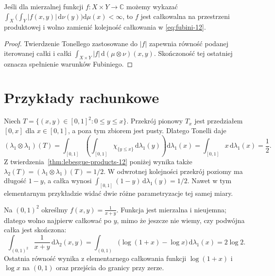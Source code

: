 \begin{wniosek}
\label{cor:practical-fubini-12}
Jeśli dla mierzalnej funkcji $f:X\times Y\to\mathbb C$
możemy wykazać
$\int_X\bigl(\int_Y |f(x,y)|\,\mathrm d\nu(y)\bigr)
\mathrm d\mu(x)<\infty$, to $f$ jest całkowalna
na przestrzeni produktowej i wolno zamienić kolejność
całkowania w \eqref{eq:fubini-12}.
\end{wniosek}
\begin{proof}
Twierdzenie Tonellego zastosowane do $|f|$ zapewnia
równość podanej iterowanej całki i całki
$\int_{X\times Y}|f|\,\mathrm d(\mu\otimes\nu)(x,y)$.
Skończoność tej ostatniej oznacza spełnienie
warunków Fubiniego.
\end{proof}

\section{Przykłady rachunkowe}

\begin{przyklad}
Niech $T=\{(x,y)\in[0,1]^2:0\le y\le x\}$.
Przekrój pionowy $T_x$ jest przedziałem $[0,x]$
dla $x\in[0,1]$, a poza tym zbiorem jest pusty.
Dlatego Tonelli daje
\[
(\lambda_1\otimes\lambda_1)(T)=\int_{[0,1]}\left(
\int_{[0,1]}\chi_{\{y\le x\}}\,\mathrm d\lambda_1(y)
\right)\mathrm d\lambda_1(x)
=\int_{[0,1]}x\,\mathrm d\lambda_1(x)=\frac12.
\]
Z twierdzenia~\ref{thm:lebesgue-products-12} poniżej wynika także
$\lambda_2(T)=(\lambda_1\otimes\lambda_1)(T)=1/2$.
W odwrotnej kolejności przekrój poziomy ma długość
$1-y$, a całka wynosi
$\int_{[0,1]}(1-y)\,\mathrm d\lambda_1(y)=1/2$.
Nawet w tym elementarnym przykładzie widać dwie
różne parametryzacje tej samej miary.
\end{przyklad}

\begin{przyklad}
Na $(0,1)^2$ określmy $f(x,y)=\frac{1}{x+y}$.
Funkcja jest mierzalna i nieujemna; dlatego wolno
najpierw całkować po $y$, mimo że jeszcze nie
wiemy, czy podwójna całka jest skończona:
\[
\int_{(0,1)^2}\frac{1}{x+y}\,\mathrm d\lambda_2(x,y)
=\int_{(0,1)}\bigl(\log(1+x)-\log x\bigr)
\,\mathrm d\lambda_1(x)=2\log2.
\]
Ostatnia równość wynika z elementarnego
całkowania funkcji $\log(1+x)$ i $\log x$
na $(0,1)$ oraz przejścia do granicy przy zerze.
\end{przyklad}

